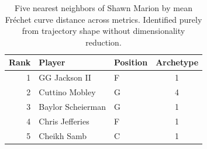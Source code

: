 \begin{table}[htbp]
  \centering\small
  \begin{tabular}{rllc}
    \toprule
    Rank & Player & Position & Archetype \\
    \midrule
    1 & GG Jackson II & F & 1 \\
    2 & Cuttino Mobley & G & 4 \\
    3 & Baylor Scheierman & G & 1 \\
    4 & Chris Jefferies & F & 1 \\
    5 & Cheikh Samb & C & 1 \\
    \bottomrule
  \end{tabular}
  \caption{Five nearest neighbors of Shawn Marion by mean Fr\'{e}chet curve distance across metrics. Identified purely from trajectory shape without dimensionality reduction.}
  \label{tab:Shawn_Marion_frechet_curve_neighbors}
\end{table}

